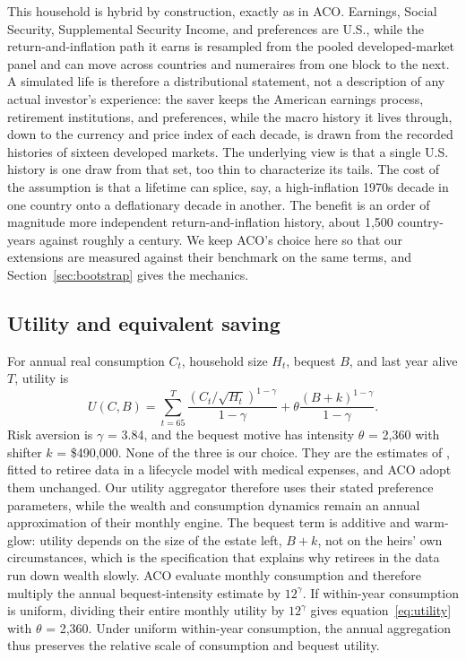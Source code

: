 \documentclass[11pt]{article}
\begin{document}
This household is hybrid by construction, exactly as in ACO. Earnings, Social
Security, Supplemental Security Income, and preferences are U.S., while the
return-and-inflation path it earns is resampled from the pooled
developed-market panel and can move across countries and numeraires from one
block to the next. A simulated life is therefore a distributional statement,
not a description of any actual investor's experience: the saver keeps the
American earnings process, retirement institutions, and preferences, while the
macro history it lives through, down to the currency and price index of each
decade, is drawn from the recorded
histories of sixteen developed markets. The underlying view is that a single
U.S. history is one draw from that set, too thin to characterize its tails.
The cost of the
assumption is that a lifetime can splice, say, a high-inflation
1970s decade in one country onto a deflationary decade in another. The benefit
is an order of magnitude more independent return-and-inflation history, about
1{,}500 country-years against roughly a
century. We keep ACO's choice here so that our extensions are measured against
their benchmark on the same terms, and Section~\ref{sec:bootstrap} gives the
mechanics.

\subsection{Utility and equivalent saving}

For annual real consumption $C_t$, household size $H_t$, bequest $B$, and last
year alive $T$, utility is
\begin{equation}
 U(C,B)=\sum_{t=65}^{T}
 \frac{(C_t/\sqrt{H_t})^{1-\gamma}}{1-\gamma}
 +\theta\frac{(B+k)^{1-\gamma}}{1-\gamma}.
 \label{eq:utility}
\end{equation}
Risk aversion is $\gamma$ = 3.84, and the bequest motive has intensity
$\theta$ = 2,360 with shifter $k$ = \$490,000. None of the three is our
choice. They are the estimates of \citet{DeNardiFrenchJones2010}, fitted to
retiree data in a lifecycle model with medical expenses, and ACO adopt them
unchanged. Our utility aggregator therefore uses their stated preference
parameters, while the wealth and consumption dynamics remain an annual
approximation of their monthly engine. The bequest term is additive and
warm-glow: utility depends on the size of the estate left,
$B+k$, not on the heirs' own circumstances, which is the specification that
explains why retirees in the data run down wealth slowly. ACO evaluate monthly
consumption and therefore multiply the annual bequest-intensity estimate by
$12^\gamma$. If within-year consumption is uniform, dividing their
entire monthly utility by $12^\gamma$ gives equation~\eqref{eq:utility} with
$\theta$ = 2,360. Under uniform within-year consumption, the annual aggregation
thus preserves the relative scale of consumption and bequest utility.
\end{document}
